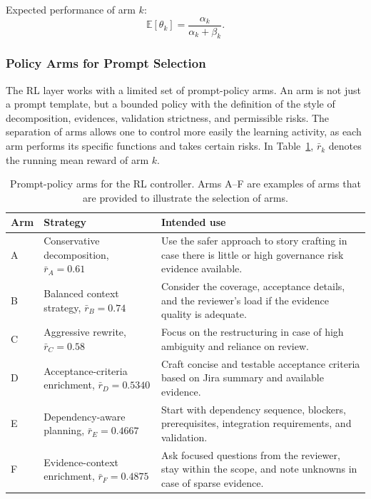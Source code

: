 \documentclass[pdflatex,sn-basic]{sn-jnl}
\begin{document}
Expected performance of arm $k$:
\begin{equation}
\mathbb{E}[\theta_k] = \frac{\alpha_k}{\alpha_k+\beta_k}.
\end{equation}

\subsubsection{Policy Arms for Prompt Selection}

The RL layer works with a limited set of prompt-policy arms. An arm is not just a prompt template, but a bounded policy with the definition of the style of decomposition, evidences, validation strictness, and permissible risks. The separation of arms allows one to control more easily the learning activity, as each arm performs its specific functions and takes certain risks. In Table~\ref{tab:policy-arms}, $\bar r_k$ denotes the running mean reward of arm $k$.

\begin{table}[htbp]
\centering
\small
\caption{Prompt-policy arms for the RL controller. Arms A--F are examples of arms that are provided to illustrate the selection of arms.}
\label{tab:policy-arms}
\begin{tabularx}{\columnwidth}{@{}p{}p{}X@{}}
\toprule
Arm & Strategy & Intended use \\
\midrule
A & Conservative decomposition, $\bar r_A=0.61$ & Use the safer approach to story crafting in case there is little or high governance risk evidence available. \\
B & Balanced context strategy, $\bar r_B=0.74$ & Consider the coverage, acceptance details, and the reviewer's load if the evidence quality is adequate. \\
C & Aggressive rewrite, $\bar r_C=0.58$ & Focus on the restructuring in case of high ambiguity and reliance on review. \\
D & Acceptance-criteria enrichment, $\bar r_D=0.5340$ & Craft concise and testable acceptance criteria based on Jira summary and available evidence. \\
E & Dependency-aware planning, $\bar r_E=0.4667$ & Start with dependency sequence, blockers, prerequisites, integration requirements, and validation. \\
F & Evidence-context enrichment, $\bar r_F=0.4875$ & Ask focused questions from the reviewer, stay within the scope, and note unknowns in case of sparse evidence. \\
\bottomrule
\end{tabularx}
\end{table}
\end{document}
